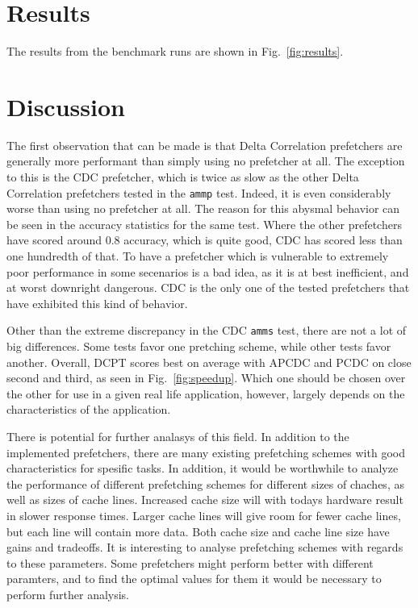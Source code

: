 \documentclass[a4paper]{IEEEtran}
\begin{document}
\section{Results}

The results from the benchmark runs are shown in Fig.~\ref{fig:results}.

\section{Discussion}

The first observation that can be made is that Delta Correlation prefetchers are generally more performant than simply using no prefetcher at all.
The exception to this is the CDC prefetcher, which is twice as slow as the other Delta Correlation prefetchers tested in the \texttt{ammp} test.
Indeed, it is even considerably worse than using no prefetcher at all.
The reason for this abysmal behavior can be seen in the accuracy statistics for the same test.
Where the other prefetchers have scored around 0.8 accuracy, which is quite good, CDC has scored less than one hundredth of that.
To have a prefetcher which is vulnerable to extremely poor performance in some secenarios is a bad idea, as it is at best inefficient, and at worst downright dangerous.
CDC is the only one of the tested prefetchers that have exhibited this kind of behavior.





Other than the extreme discrepancy in the CDC \texttt{amms} test, there are not a lot of big differences.
Some tests favor one pretching scheme, while other tests favor another.
Overall, DCPT scores best on average with APCDC and PCDC on close second and third, as seen in Fig.~\ref{fig:speedup}.
Which one should be chosen over the other for use in a given real life application, however, largely depends on the characteristics of the application.


There is potential for further analasys of this field.
In addition to the implemented prefetchers, there are many existing prefetching schemes with good characteristics for spesific tasks.
In addition, it would be worthwhile to analyze the performance of different prefetching schemes for different sizes of chaches, as well as sizes of cache lines.
Increased cache size will with todays hardware result in slower response times.
Larger cache lines will give room for fewer cache lines, but each line will contain more data.
Both cache size and cache line size have gains and tradeoffs.
It is interesting to analyse prefetching schemes with regards to these parameters.
Some prefetchers might perform better with different paramters, and to find the optimal values for them it would be necessary to perform further analysis.
\end{document}
